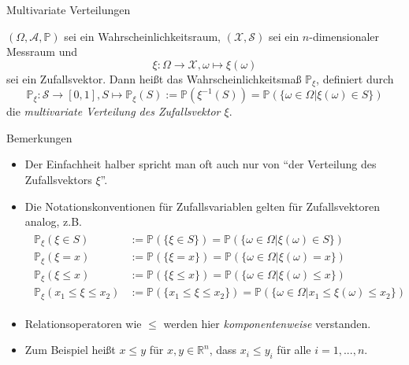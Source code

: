 \documentclass[
  8pt,
  ignorenonframetext,
]{beamer}
\providecommand{\tightlist}{%
  \setlength{\itemsep}{0pt}\setlength{\parskip}{0pt}}
\begin{document}
\begin{frame}{Multivariate Verteilungen}
\protect\hypertarget{multivariate-verteilungen}{}
\small
\begin{definition}
\justifying
$(\Omega, \mathcal{A}, \mathbb{P})$ sei ein Wahrscheinlichkeitsraum, 
$(\mathcal{X},\mathcal{S})$ sei ein $n$-dimensionaler Messraum und
\begin{equation}
\xi : \Omega \to \mathcal{X}, \omega \mapsto \xi(\omega)
\end{equation}
sei ein Zufallsvektor. Dann heißt das Wahrscheinlichkeitsmaß $\mathbb{P}_\xi$, 
definiert durch
\begin{equation}
\mathbb{P}_\xi : \mathcal{S} \to [0,1], S \mapsto \mathbb{P}_\xi(S)
:= \mathbb{P}(\xi^{-1}(S))
 = \mathbb{P}\left(\{\omega \in \Omega|\xi(\omega) \in S\}\right)
\end{equation}
die \textit{multivariate Verteilung des Zufallsvektor $\xi$}.
\end{definition}
\footnotesize

Bemerkungen

\begin{itemize}
\tightlist
\item
  Der Einfachheit halber spricht man oft auch nur von ``der Verteilung
  des Zufallsvektors \(\xi\)''.
\item
  Die Notationskonventionen für Zufallsvariablen gelten für
  Zufallsvektoren analog, z.B. \begin{align}
  \begin{split}
  \mathbb{P}_\xi(\xi \in S)
  & := \mathbb{P}\left(\{\xi \in S\} \right)
  = \mathbb{P}\left(\{\omega \in \Omega|\xi(\omega) \in S\} \right)
  \\
  \mathbb{P}_\xi(\xi = x)
  & := \mathbb{P}\left(\{\xi = x\} \right)
  = \mathbb{P}\left(\{\omega \in \Omega|\xi(\omega) = x\} \right)
  \\
  \mathbb{P}_\xi(\xi \le x)
  & := \mathbb{P}\left(\{\xi \le x\} \right)
  = \mathbb{P}\left(\{\omega \in \Omega|\xi(\omega) \le x\} \right)
  \\
  \mathbb{P}_\xi(x_1 \le \xi \le x_2)
  & := \mathbb{P}\left(\{x_1 \le \xi \le x_2\} \right)
   = \mathbb{P}\left(\{\omega \in \Omega|x_1 \le \xi(\omega) \le x_2\} \right)
  \end{split}
  \end{align}
\item
  Relationsoperatoren wie \(\le\) werden hier \textit{komponentenweise}
  verstanden.
\item
  Zum Beispiel heißt \(x \le y\) für \(x,y \in \mathbb{R}^n\), dass
  \(x_i \le y_i\) für alle \(i = 1,...,n\).
\end{itemize}
\end{frame}
\end{document}

